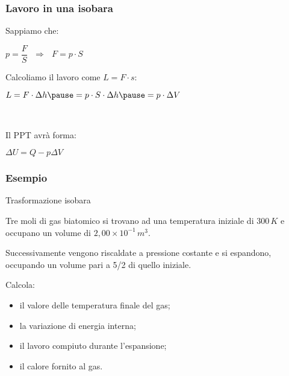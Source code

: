 \documentclass[]{beamer}
\theoremstyle{plain}
\begin{document}
\begin{frame}
\frametitle{Lavoro in una isobara}
Sappiamo che:
\begin{center}
$ p = \dfrac{F}{S} ~~~\Longrightarrow ~~~ F = p \cdot S $
\end{center}\pause
Calcoliamo il lavoro come $ L = F \cdot s $:
\begin{center}
$ L = F \cdot \Delta h \pause = p \cdot S \cdot \Delta h \pause = p \cdot \Delta V $
\end{center}\pause

~

Il PPT avrà forma:
\begin{center}
\colorbox{blue!30}{$ \Delta U = Q - p \Delta V $}
\end{center}
\end{frame}

\begin{frame}
\frametitle{Esempio}
\begin{exampleblock}{Trasformazione isobara}
{\small 
Tre moli di gas biatomico si trovano ad una temperatura iniziale di $ 300 \, K $ e occupano un volume di $ 2,00 \times 10^{-1} \, m^3 $.

Successivamente vengono riscaldate a pressione costante e si espandono, occupando un volume pari a 5/2 di quello iniziale.

Calcola:
\begin{itemize}
    \item il valore delle temperatura finale del gas;
    \item la variazione di energia interna;
    \item il lavoro compiuto durante l'espansione;
    \item il calore fornito al gas.
\end{itemize}
}
\end{exampleblock}
\end{frame}
\end{document}
